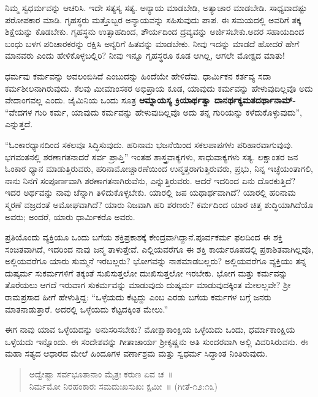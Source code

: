 ನಿಮ್ಮ ಸ್ವಧರ್ಮವನ್ನು ಆಚರಿಸಿ. ಇದೇ ಸತ್ಯಸ್ಯ ಸತ್ಯ. ಅನ್ಯಾಯ ಮಾಡಬೇಡಿ, ಅತ್ಯಾಚಾರ ಮಾಡಬೇಡಿ. ಸಾಧ್ಯವಾದಷ್ಟು ಪರೋಪಕಾರ ಮಾಡಿ. ಗೃಹಸ್ಥರು ಮತ್ತೊಬ್ಬರ ಅನ್ಯಾಯವನ್ನು ಸಹಿಸುವುದು ಪಾಪ. ಈ ಸಮಯದಲ್ಲಿ ಅವರಿಗೆ ತಕ್ಕ ಶಿಕ್ಷೆಯನ್ನು ಕೊಡಬೇಕು. ಗೃಹಸ್ಥನು ಉತ್ಸಾಹದಿಂದ, ಶೌರ್ಯದಿಂದ ದ್ರವ್ಯವನ್ನು ಅರ್ಜಿಸಬೇಕು.ಅದರ ಸಹಾಯದಿಂದ ಬಂಧು ಬಳಗ ಪರಿಚಾರಕರನ್ನು ರಕ್ಷಿಸಿ ಅನ್ಯರಿಗೆ ಹಿತವನ್ನು ಮಾಡಬೇಕು. ನೀವು ಇದನ್ನು ಮಾಡದೆ ಹೋದರೆ ಹೇಗೆ ಮಾನವರು ಎಂದು ಹೇಳಿಕೊಳ್ಳಬಲ್ಲಿರಿ? ನೀವು ಇನ್ನೂ ಗೃಹಸ್ಥರೂ ಕೂಡ ಆಗಿಲ್ಲ, ಆಗಲೇ ಮೋಕ್ಷದ ಮಾತು!

ಧರ್ಮವು ಕರ್ಮವನ್ನು ಅವಲಂಬಿಸಿದೆ ಎಂಬುದನ್ನು ಹಿಂದೆಯೇ ಹೇಳಿದೆವು. ಧಾರ್ಮಿ\break ಕನ ಕರ್ತವ್ಯ ಸದಾ ಕರ್ಮಶೀಲನಾಗಿರುವುದು. ಕೆಲವು ಮೀಮಾಂಸಕರ ಅಭಿಪ್ರಾಯ ಕೂಡ, ಯಾವುದು ಕರ್ಮವನ್ನು ಹೇಳುವುದಿಲ್ಲವೊ ಅದು ವೇದಾಂಗವಲ್ಲ ಎಂದು. ಜೈಮಿನಿಯ ಒಂದು ಸೂತ್ರ \textbf{ಆಮ್ನಾಯಸ್ಯ ಕ್ರಿಯಾರ್ಥತ್ವಾ ದಾನರ್ಥಕ್ಯಮತದರ್ಥಾನಾಮ್​-} “ವೇದಗಳ ಗುರಿ ಕರ್ಮ, ಯಾವುದು ಕರ್ಮವನ್ನು ಹೇಳುವುದಿಲ್ಲವೊ ಅದು ತನ್ನ ಗುರಿಯನ್ನು ಕಳೆದುಕೊಳ್ಳುವುದು”, ಎನ್ನುತ್ತದೆ.

“ಓಂಕಾರಧ್ಯಾನದಿಂದ ಸಕಲವೂ ಸಿದ್ಧಿಸುವುದು. ಹರಿನಾಮ ಭಜನೆಯಿಂದ ಸಕಲ\break ಪಾಪಗಳು ಪರಿಹಾರವಾಗುವುವು. ಭಗವಂತನಲ್ಲಿ ಶರಣಾಗತನಾದರೆ ಸರ್ವ ಪ್ರಾಪ್ತಿ” ಇಂತಹ ಶಾಸ್ತ್ರವಾಕ್ಯಗಳು, ಸಾಧುವಾಕ್ಯಗಳು ಸತ್ಯ. ಲಕ್ಷಾಂತರ ಜನ ಓಂಕಾರ ಧ್ಯಾನ ಮಾಡುತ್ತಿರುವರು, ಹರಿನಾಮೋಚ್ಚಾರಣೆಯಿಂದ ಉನ್ಮತ್ತರಾಗುತ್ತಿರುವರು, ಪ್ರಭು, ನಿನ್ನ ಇಚ್ಛೆಯಂತಾಗಲಿ, ನಾನು ನಿನಗೆ ಸಂಪೂರ್ಣವಾಗಿ ಶರಣಾಗತನಾಗಿರುವೆನು, ಎನ್ನುತ್ತಿರು\-ವರು. ಆದರೆ ಇದರಿಂದ ಏನು ದೊರಕುತ್ತಿದೆ? ಇದರ ಅರ್ಥವನ್ನು ನಾವು ಚೆನ್ನಾಗಿ ತಿಳಿದುಕೊಳ್ಳಬೇಕು. ಯಾರಲ್ಲಿ ಜಪ ಯಥಾರ್ಥವಾಗಿದೆ? ಯಾರಲ್ಲಿ ಹರಿನಾಮ ಸ್ಮರಣೆ ವಜ್ರದಂತೆ ಅಮೋಘವಾಗಿದೆ? ಯಾರು ನಿಜವಾಗಿ ಹರಿ ಶರಣರು? ಕರ್ಮದಿಂದ ಯಾರ ಚಿತ್ತ ಶುದ್ಧಿಯಾಗಿದೆಯೊ ಅವರು; ಅಂದರೆ, ಯಾರು ಧಾರ್ಮಿಕರೊ ಅವರು.

ಪ್ರತಿಯೊಂದು ವ್ಯಕ್ತಿಯೂ ಒಂದು ಬಗೆಯ ಶಕ್ತಿಪ್ರಕಾಶಕ್ಕೆ ಕೇಂದ್ರವಾಗಿದ್ದಾನೆ.\break ಪೂರ್ವಕರ್ಮ ಫಲದಿಂದ ಈ ಶಕ್ತಿ ಸಂಚಿತವಾಗಿದೆ, ಇದರಿಂದ ನಾವು ಜನ್ಮ ತಾಳುತ್ತೇವೆ. ಎಲ್ಲಿಯವರೆಗೂ ಈ ಶಕ್ತಿ ಕಾರ್ಯರೂಪದಲ್ಲಿ ಪ್ರಕಾಶಿತವಾಗಿಲ್ಲವೊ, ಅಲ್ಲಿಯವರೆಗೂ ಯಾರು ಸುಮ್ಮನೆ ಇರಬಲ್ಲರು? ಭೋಗವನ್ನು ನಾಶಮಾಡಬಲ್ಲರು? ಅಲ್ಲಿಯವರೆಗೂ ವ್ಯಕ್ತಿಯು ತನ್ನ ದುಷ್ಕರ್ಮ ಸುಕರ್ಮಗಳಿಗೆ ತಕ್ಕಂತೆ ಸುಖಿಸುತ್ತಲೋ ದುಃಖಿಸುತ್ತಲೋ ಇರಬೇಕು. ಭೋಗ ಮತ್ತು ಕರ್ಮವನ್ನು ತೊರೆಯಲು ಆಗದೆ ಇರುವಾಗ ಸುಕರ್ಮವನ್ನು ಮಾಡುವುದು ದುಷ್ಕರ್ಮ ಮಾಡುವುದಕ್ಕಿಂತ ಮೇಲಲ್ಲವೇ? ಶ‍್ರೀ ರಾಮಪ್ರಸಾದ ಹೀಗೆ ಹೇಳುತ್ತಿದ್ದ: “ಒಳ್ಳೆಯದು ಕೆಟ್ಟದ್ದು ಎಂಬ ಎರಡು ಬಗೆಯ ಕರ್ಮಗಳ ಬಗ್ಗೆ ಜನರು ಮಾತನಾಡುತ್ತಾರೆ. ಅದರಲ್ಲಿ ಒಳ್ಳೆಯದು ಕೆಟ್ಟದಕ್ಕಿಂತ ಮೇಲು.”

ಈಗ ನಾವು ಯಾವ ಒಳ್ಳೆಯದನ್ನು ಅನುಸರಿಸಬೇಕು? ಮೋಕ್ಷಾಕಾಂಕ್ಷಿಯ ಒಳ್ಳೆಯದು ಒಂದು, ಧರ್ಮಾಕಾಂಕ್ಷಿಯ ಒಳ್ಳೆಯದು ಇನ್ನೊಂದು. ಈ ಸಂದೇಶವನ್ನು ಗೀತಾಚಾರ್ಯ ಶ‍್ರೀಕೃಷ್ಣನು ಅತಿ ಸುಂದರವಾಗಿ ಅಲ್ಲಿ ವಿವರಿಸಿರುವನು. ಈ ಮಹಾ ಸತ್ಯದ ಆಧಾರದ ಮೇಲೆ ಹಿಂದೂಗಳ ವರ್ಣಾಶ್ರಮ ಮತ್ತು ಸ್ವಧರ್ಮ ಸಿದ್ಧಾಂತ ನಿಂತಿರುವುದು.

\begin{verse}
ಅದ್ವೇಷ್ಟಾ ಸರ್ವಭೂತಾನಾಂ ಮೈತ್ರಃ ಕರುಣ ಏವ ಚ~॥\\ನಿರ್ಮಮೋ ನಿರಹಂಕಾರಃ ಸಮದುಃಖಸುಖಃ ಕ್ಷಮೀ~॥ (ಗೀತೆ-೧೨:೧೩)
\end{verse}

